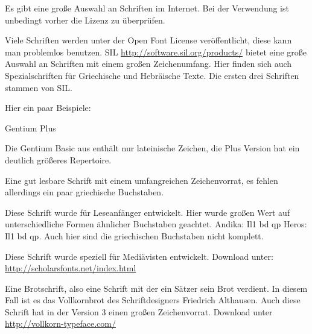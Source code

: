 \iffalse
{}

\newfontfamily{}
\newfontfamily{}
\newfontfamily{}
\newfontfamily{}
\newfontfamily{}

Es gibt eine große Auswahl an Schriften im Internet.
Bei der Verwendung ist unbedingt vorher die Lizenz zu überprüfen.

Viele Schriften werden unter der Open Font License veröffentlicht, diese kann man problemlos benutzen.
SIL \url{http://software.sil.org/products/} bietet eine große Auswahl an Schriften mit einem großen Zeichenumfang.
Hier finden sich auch Spezialschriften für Griechische und Hebräische Texte.
Die ersten drei Schriften stammen von SIL.

Hier ein paar Beispiele:

\begin{labeling}{Gentium Plus}
\item[Gentium Plus] Die Gentium Basic aus \TeXLive{} enthält nur lateinische Zeichen, 
	die Plus Version hat ein deutlich größeres Repertoire.
\item[Charis SIL] Eine gut lesbare Schrift mit einem umfangreichen Zeichenvorrat, 
	es fehlen allerdings ein paar griechische Buchstaben. 
\item[Andika] Diese Schrift wurde für Leseanfänger entwickelt. 
	Hier wurde großen Wert auf unterschiedliche Formen ähnlicher Buchstaben geachtet.
	Andika: {\ABfont Il1 bd qp} Heros: {\HEfont Il1 bd qp}.
	Auch hier sind die griechischen Buchstaben nicht komplett.
\item[Cardo] Diese Schrift wurde speziell für Mediävisten entwickelt. 
 Download unter: \url{http://scholarsfonts.net/index.html}
\item[Vollkorn] Eine Brotschrift, also eine Schrift mit der ein Sätzer sein Brot verdient. 
	In diesem Fall ist es das Vollkornbrot des Schriftdesigners Friedrich Althausen.
	Auch diese Schrift hat in der Version 3 einen großen Zeichenvorrat. 
	Download unter \url{http://vollkorn-typeface.com/}
\end{labeling}

